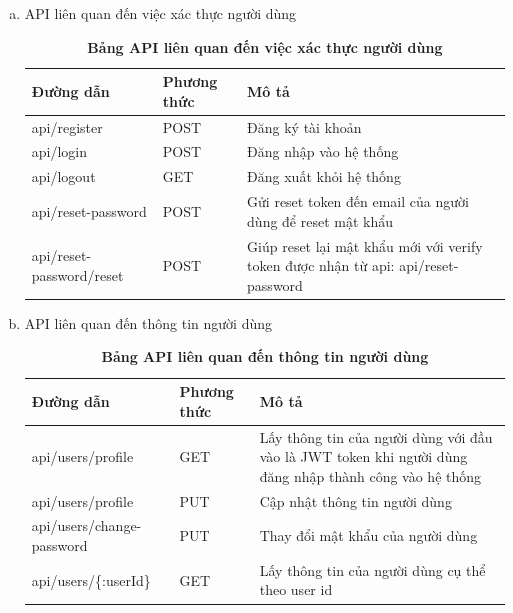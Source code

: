 \begin{enumerate}[a)]
  \item API liên quan đến việc xác thực người dùng


\begin{table}[H]
  \centering
  \caption{\bfseries \fontsize{12pt}{0pt}\selectfont Bảng API liên quan đến việc xác thực người dùng}
  \begin{tabularx}{0.9\textwidth}{
  | >{\raggedright\arraybackslash}X
  | >{\raggedright\arraybackslash}m{2cm}
  | >{\raggedright\arraybackslash}X|
  }
  \hline
  \bfseries Đường dẫn    &\bfseries Phương thức    &\bfseries Mô tả\\ \hline
  api/register   &   POST  & Đăng ký tài khoản \\ \hline
  api/login   &    POST    & Đăng nhập vào hệ thống \\ \hline
  api/logout  &   GET     & Đăng xuất khỏi hệ thống \\ \hline
  api/reset-password  &     POST   &  Gửi reset token đến email của người dùng để reset mật khẩu \\  \hline
  api/reset-password/reset &   POST     & Giúp reset lại mật khẩu mới với verify token được nhận từ api: api/reset-password  \\ \hline

  \end{tabularx}
  \label{table_api_auth}
\end{table}

  \item API liên quan đến thông tin người dùng
  

  \begin{table}[H]
    \centering
    \caption{\bfseries \fontsize{12pt}{0pt}\selectfont Bảng API liên quan đến thông tin người dùng}
    \begin{tabularx}{0.9\textwidth}{
    | >{\raggedright\arraybackslash}X
    | >{\raggedright\arraybackslash}m{2cm}
    | >{\raggedright\arraybackslash}X|
    }
    \hline
    \bfseries Đường dẫn    &\bfseries Phương thức    &\bfseries Mô tả\\ \hline
   api/users/profile   &   GET  &  Lấy thông tin của người dùng với đầu vào là JWT token khi người dùng đăng nhập thành công vào hệ thống \\  \hline
   api/users/profile   &    PUT    &  Cập nhật thông tin người dùng \\  \hline
   api/users/change-password   &   PUT     & Thay đổi mật khẩu của người dùng  \\ \hline
   api/users/\{:userId\}  &   GET     & Lấy thông tin của người dùng cụ thể theo user id \\ \hline


\end{tabularx}
\end{table}
\end{enumerate}
